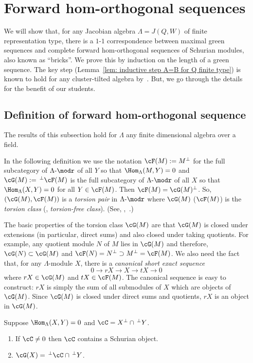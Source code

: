 \section{Forward hom-orthogonal sequences}\label{sect2}


We will show that, for any Jacobian algebra $\Lambda=J(Q,W)$ of finite representation type, there is a $1$-$1$ correspondence between maximal green sequences and complete forward hom-orthogonal sequences of Schurian modules, also known as ``bricks''. We prove this by induction on the length of a green sequence. The key step (Lemma~\ref{lem: inductive step A=B for Q finite type}) is known to hold for any cluster-tilted algebra by~\cite{BIRSm}.
But, we go through the details for the benefit of our students.
\subsection{Definition of forward hom-orthogonal sequence}

The results of this subsection hold for $\Lambda$ any finite dimensional algebra over a field.

In the following definition we use the notation $\cF(M):=M^\perp$ for the full subcategory of $\Lambda\text{-}\modr$ of all $Y$ so that $\Hom_\Lambda(M,Y)=0$ and $\cG(M):=\,^\perp\cF(M)$ is the full subcategory of $\Lambda\text{-}\modr$ of all $X$ so that $\Hom_\Lambda(X,Y)=0$ for all $Y\in\cF(M)$. Then $\cF(M)=\cG(M)^\perp$. So, $(\cG(M),\cF(M))$ is a \emph{torsion pair} in $\Lambda\text{-}\modr$ where $\cG(M)$ (\resp  $\cF(M)$) is the \emph{torsion class} (\resp , \emph{torsion-free class}). (See, \eg ,~\cite{BeRe}.) 

The basic properties of the {torsion class} $\cG(M)$ are that $\cG(M)$ is closed under extensions (in particular, direct sums) and also closed under taking quotients. For example, any quotient module $N$ of $M$ lies in $\cG(M)$ and therefore, $\cG(N)\subset\cG(M)$ and $\cF(N)=N^\perp\supset M^\perp=\cF(M)$. We also need the fact that, for any $\Lambda$-module $X$, there is a \emph{canonical short exact sequence}
\[
	0\to rX\to X\to tX\to 0
\]
where $rX\in \cG(M)$ and $tX\in \cF(M)$. The canonical sequence is easy to construct: $rX$ is simply the sum of all submodules of $X$ which are objects of $\cG(M)$. Since $\cG(M)$ is closed under direct sums and quotients, $rX$ is an object in $\cG(M)$.




\begin{prop}\label{prop: HN stratification with 3 strata}
Suppose $\Hom_\Lambda(X,Y)=0$ and $\cC=X^\perp\cap\,^\perp Y$. 
\begin{enumerate}
\item\label{prop2.1_1} If $\cC\neq0$ then $\cC$ contains a Schurian object.
\item\label{prop2.1_2} $\cG(X)=\,^\perp \cC\cap\,^\perp Y$.
\end{enumerate}
\end{prop}

